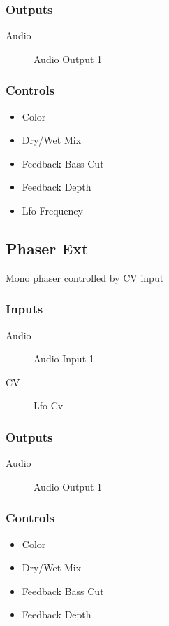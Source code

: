 \subsubsection{Outputs}
\begin{description}
\item [Audio] Audio Output 1
\end{description}

\subsubsection{Controls}
\begin{itemize}
\item Color
\item Dry/Wet Mix
\item Feedback Bass Cut
\item Feedback Depth
\item Lfo Frequency
\end{itemize}

\subsection{Phaser Ext}

Mono phaser controlled by CV input



\subsubsection{Inputs}
\begin{description}
\item [Audio] Audio Input 1
\item [CV] Lfo Cv
\end{description}

\subsubsection{Outputs}
\begin{description}
\item [Audio] Audio Output 1
\end{description}

\subsubsection{Controls}
\begin{itemize}
\item Color
\item Dry/Wet Mix
\item Feedback Bass Cut
\item Feedback Depth
\end{itemize}

